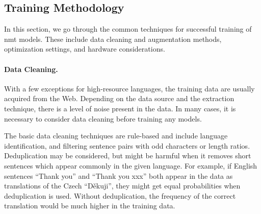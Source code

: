 
\subsection{Training Methodology}
\label{sec:training:methodology}

In this section, we go through the common techniques for successful training of
\gls{nmt} models. These include data cleaning and augmentation methods,
optimization settings, and hardware considerations.

\paragraph{Data Cleaning.} With a few exceptions for high-resource languages,
the training data are usually acquired from the Web. Depending on the data
source and the extraction technique, there is a level of noise present in the
data. In many cases, it is necessary to consider data cleaning before training
any models.

The basic data cleaning techniques are rule-based and include language
identification, and filtering sentence pairs with odd characters or length
ratios. Deduplication may be considered, but might be harmful when it removes
short sentences which appear commonly in the given language. For example, if
English sentences ``Thank you'' and ``Thank you xxx'' both appear in the data
as translations of the Czech ``Děkuji'', they might get equal probabilities
when deduplication is used. Without deduplication, the frequency of the correct
translation would be much higher in the training data.

